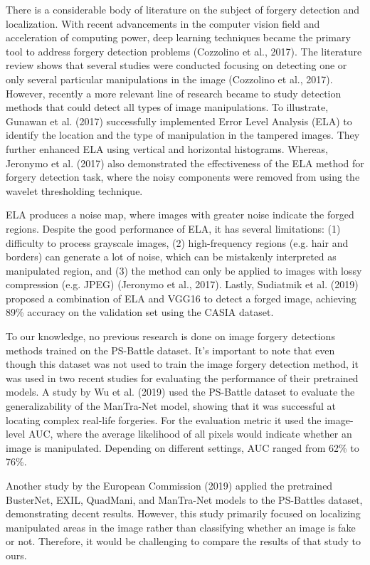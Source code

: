 \documentclass[11pt]{article}
\begin{document}
There is a considerable body of literature on the subject of forgery detection and localization. With recent advancements in the computer vision field and acceleration of computing power, deep learning techniques became the primary tool to address forgery detection problems (Cozzolino et al., 2017). The literature review shows that several studies were conducted focusing on detecting one or only several particular manipulations in the image (Cozzolino et al., 2017). However, recently a more relevant line of research became to study detection methods that could detect all types of image manipulations. To illustrate, Gunawan et al. (2017) successfully implemented Error Level Analysis (ELA) to identify the location and the type of manipulation in the tampered images. They further enhanced ELA using vertical and horizontal histograms.  Whereas, Jeronymo et al. (2017) also demonstrated the effectiveness of the ELA method for forgery detection task, where the noisy components were removed from using the wavelet thresholding technique.

ELA produces a noise map, where images with greater noise indicate the forged regions. Despite the good performance of ELA, it has several limitations: (1) difficulty to process grayscale images, (2) high-frequency regions (e.g. hair and borders) can generate a lot of noise, which can be mistakenly interpreted as manipulated region, and (3) the method can only be applied to images with lossy compression (e.g. JPEG) (Jeronymo et al., 2017). Lastly, Sudiatmik et al. (2019) proposed a combination of ELA and VGG16 to detect a forged image, achieving 89\% accuracy on the validation set using the CASIA dataset.

To our knowledge, no previous research is done on image forgery detections methods trained on the PS-Battle dataset. It’s important to note that even though this dataset was not used to train the image forgery detection method, it was used in two recent studies for evaluating the performance of their pretrained models. A study by Wu et al. (2019) used the PS-Battle dataset to evaluate the generalizability of the ManTra-Net model, showing that it was successful at locating complex real-life forgeries. For the evaluation metric it used the image-level AUC, where the average likelihood of all pixels would indicate whether an image is manipulated. Depending on different settings, AUC ranged from 62\% to 76\%.

Another study by the European Commission (2019) applied the pretrained BusterNet, EXIL, QuadMani, and ManTra-Net models to the PS-Battles dataset, demonstrating decent results. However, this study primarily focused on localizing manipulated areas in the image rather than classifying whether an image is fake or not. Therefore, it would be challenging to compare the results of that study to ours.
\end{document}
